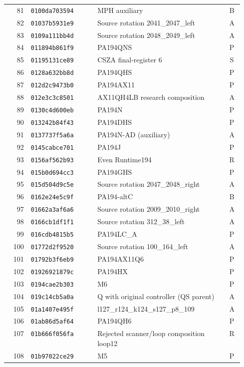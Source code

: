 \begin{longtable}{@{}r l p{0.55\linewidth} c@{}}
81 & \texttt{0100da703594} & MPH auxiliary & B \\
82 & \texttt{01037b5931e9} & Source rotation 2041\_2047\_left & A \\
83 & \texttt{0109a111bb4d} & Source rotation 2048\_2049\_left & A \\
84 & \texttt{011894b861f9} & PA194QNS & P \\
85 & \texttt{01195131ce89} & CSZA final-register 6 & S \\
86 & \texttt{0128a632bb8d} & PA194QHS & P \\
87 & \texttt{012d2c9473b0} & PA194AX11 & P \\
88 & \texttt{012e3c3c8501} & AX11QH4LB research composition & A \\
89 & \texttt{0130c4d600eb} & PA194N & P \\
90 & \texttt{013242b84f43} & PA194DHS & P \\
91 & \texttt{0137737f5a6a} & PA194N-AD (auxiliary) & A \\
92 & \texttt{0145cabce701} & PA194J & P \\
93 & \texttt{0156af562b93} & Even Runtime194 & R \\
94 & \texttt{015b0d694cc3} & PA194GHS & P \\
95 & \texttt{015d504d9c5e} & Source rotation 2047\_2048\_right & A \\
96 & \texttt{0162e24e5c9f} & PA194-altC & B \\
97 & \texttt{01662a3af6a6} & Source rotation 2009\_2010\_right & A \\
98 & \texttt{0166cb1df1f1} & Source rotation 312\_38\_left & A \\
99 & \texttt{016cdb4815b5} & PA194LC\_A & P \\
100 & \texttt{01772d2f9520} & Source rotation 100\_164\_left & A \\
101 & \texttt{01792b3f6eb9} & PA194AX11Q6 & P \\
102 & \texttt{01926921879c} & PA194HX & P \\
103 & \texttt{0194cae2b303} & M6 & P \\
104 & \texttt{019c14cb5a0a} & Q with original controller (QS parent) & A \\
105 & \texttt{01a1407e495f} & l127\_r124\_k124\_s127\_p8\_109 & A \\
106 & \texttt{01ab86d5af64} & PA194QH6 & P \\
107 & \texttt{01b666f056fa} & Rejected scanner/loop composition loop12 & R \\
108 & \texttt{01b97022ce29} & M5 & P \\

\end{longtable}
